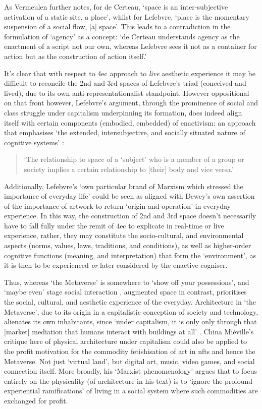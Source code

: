 As Vermeulen further notes, for de Certeau, `space is an inter-subjective activation of a static site, a place', whilst for Lefebvre, `place is the momentary suspension of a social flow, [a] space'. This leads to a contradiction in the formulation of `agency' as a concept: `de Certeau understands agency as the enactment of a script not our own, whereas Lefebvre sees it not as a container for action but as the construction of action itself.' 

It's clear that with respect to \gls{4ec} approach to \textit{live} aesthetic experience it may be difficult to reconcile the 2nd and 3rd spaces of Lefebvre's triad (conceived and lived), due to its own anti-representationalist standpoint. However oppositional on that front however, Lefebvre's argument, through the prominence of social and class struggle under capitalism underpinning its formation, does indeed align itself with certain components (embodied, embedded) of enactivism: an approach that emphasises `the extended, intersubjective, and socially situated nature of cognitive systems' \citep[p. 6]{gallagher2017}: 
\begin{quote}
    `The relationship to space of a `subject' who is a member of a group or society implies a certain relationship to [their] body and vice versa.' \cite[p. 40]{lefebvre1991}
\end{quote}
Additionally, Lefebvre's `own particular brand of Marxism which stressed the importance of everyday life' \citep[p. 8]{merrifield1993} could be seen as aligned with Dewey's own assertion of the importance of artwork to return `origin and operation' in everyday experience. In this way, the construction of 2nd and 3rd space doesn't necessarily have to fall fully under the remit of \gls{4ec} to explicate in real-time or live experience, rather, they may constitute the socio-cultural, and environmental aspects (norms, values, laws, traditions, and conditions), as well as higher-order cognitive functions (meaning, and interpretation) that form the `environment', as it is then to be experienced \textit{or} later considered by the enactive cogniser.

Thus, whereas `the Metaverse' is somewhere to `show off your possessions', and `maybe even' stage social interaction \citep{marr2022}, augmented space in contrast, prioritises the social, cultural, and aesthetic experience of the everyday. Architecture in `the Metaverse', due to its origin in a capitalistic conception of society and technology, alienates its own inhabitants, since `under capitalism, it is only only through that [market] mediation that humans interact with buildings at all' \citep[p. 18]{mieville1998}. China Miéville's critique here of physical architecture under capitalism could also be applied to the profit motivation for the commodity fetishisation of art in \glspl{nft} and hence the Metaverse. Not just `virtual land', but digital art, music, video games, and social connection itself. More broadly, his `Marxist phenomenology' argues that to focus entirely on the physicality (of architecture in his text) is to `ignore the profound experiential ramifications' of living in a social system where such commodities are exchanged for profit. 

